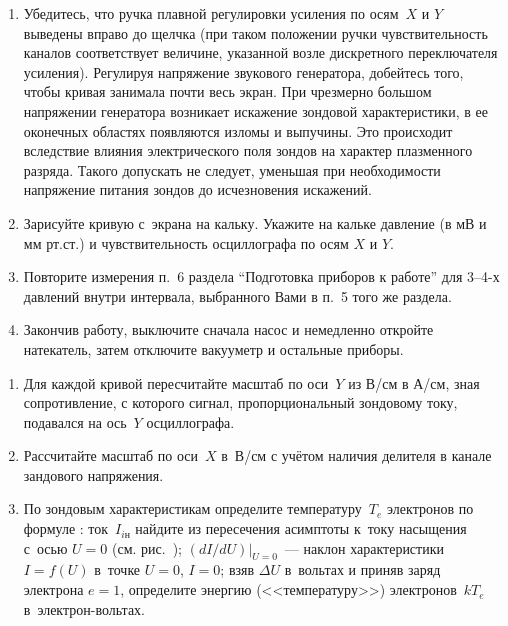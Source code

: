 \begin{lab:task}
\begin{enumerate}
\item Убедитесь, что ручка плавной регулировки усиления по осям~$X$ и $Y$ выведены вправо до щелчка (при таком положении ручки
чувствительность каналов соответствует величине, указанной возле дискретного переключателя усиления). Регулируя напряжение звукового
генератора, добейтесь того, чтобы кривая занимала почти весь экран. При чрезмерно большом напряжении генератора возникает искажение зондовой характеристики, в ее оконечных областях появляются изломы и выпучины. Это происходит вследствие влияния электрического поля зондов на характер плазменного разряда. Такого допускать не следует, уменьшая при необходимости напряжение питания зондов до исчезновения искажений.

\item Зарисуйте кривую с~экрана на кальку. Укажите на
кальке давление (в мВ и мм рт.ст.) и чувствительность осциллографа по осям $X$ и $Y$.

\item Повторите измерения п.~6 раздела ``Подготовка приборов к работе'' для 3--4-х давлений внутри интервала, выбранного Вами в п.~5 того же раздела.

\item Закончив работу, выключите сначала насос и немедленно откройте натекатель, затем отключите вакууметр и остальные приборы.

\end{enumerate}


\begin{enumerate}

\item Для каждой кривой пересчитайте масштаб по оси~$Y$ из В/см в А/см, зная сопротивление, с которого сигнал,
пропорциональный зондовому току, подавался на ось~$Y$ осциллографа.

\item Рассчитайте масштаб по оси~$X$ в~В/см с учётом наличия делителя в канале зандового напряжения.

\item По зондовым характеристикам определите температуру~$T_e$ электронов по формуле 
: ток~$I_{i\text{н}}$ найдите
из пересечения асимптоты к~току насыщения с~осью $U=0$ (см. рис.~); $(dI/dU)|_{U=0}$~--- наклон
характеристики $I=f(U)$ в~точке $U=0$, $I=0$; взяв $\Delta U$ в~вольтах и приняв заряд электрона $e=1$, определите
энергию (<<температуру>>) электронов~$kT_e$ в~электрон-вольтах.


\end{enumerate}
\end{lab:task}
